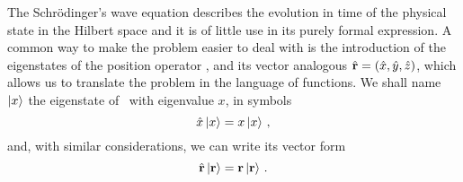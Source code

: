         The Schr\"odinger's wave equation describes the evolution in time of the physical state in the Hilbert space and it is of little use in its purely formal expression. A common way to make the problem easier to deal with is the introduction of the eigenstates of the position operator \hx, and its vector analogous $\hvr = \pqty{\hx,\hy,\hz}$, which allows us to translate the problem in the language of functions. We shall name $\ket{x}$ the eigenstate of \hx\ with eigenvalue $x$, in symbols
        \begin{equation}
            \label{eq:x-eigenvalues}
            \hat{x}\ket{x} = x\ket{x}
            \,\text{,}
        \end{equation}
        and, with similar considerations, we can write its vector form
        \begin{equation}
            \label{eq:r-eigenvalues}
            \hat{\vb{r}}\ket{\vb{r}} = \vb{r}\ket{\vb{r}}
            \,\text{.}
        \end{equation}

